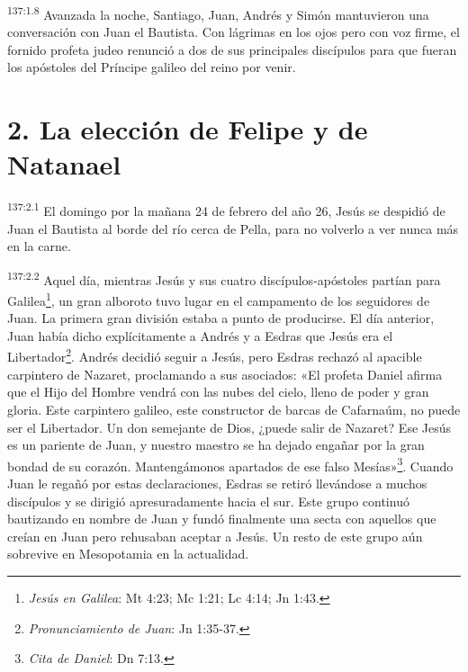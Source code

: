 \par
\textsuperscript{137:1.8} Avanzada la noche, Santiago, Juan, Andrés y Simón mantuvieron una conversación con Juan el Bautista. Con lágrimas en los ojos pero con voz firme, el fornido profeta judeo renunció a dos de sus principales discípulos para que fueran los apóstoles del Príncipe galileo del reino por venir.

\section*{2. La elección de Felipe y de Natanael}
\par
\textsuperscript{137:2.1} El domingo por la mañana 24 de febrero del año 26, Jesús se despidió de Juan el Bautista al borde del río cerca de Pella, para no volverlo a ver nunca más en la carne.

\par
\textsuperscript{137:2.2} Aquel día, mientras Jesús y sus cuatro discípulos-apóstoles partían para Galilea\footnote{\textit{Jesús en Galilea}: Mt 4:23; Mc 1:21; Lc 4:14; Jn 1:43.}, un gran alboroto tuvo lugar en el campamento de los seguidores de Juan. La primera gran división estaba a punto de producirse. El día anterior, Juan había dicho explícitamente a Andrés y a Esdras que Jesús era el Libertador\footnote{\textit{Pronunciamiento de Juan}: Jn 1:35-37.}. Andrés decidió seguir a Jesús, pero Esdras rechazó al apacible carpintero de Nazaret, proclamando a sus asociados: «El profeta Daniel afirma que el Hijo del Hombre vendrá con las nubes del cielo, lleno de poder y gran gloria. Este carpintero galileo, este constructor de barcas de Cafarnaúm, no puede ser el Libertador. Un don semejante de Dios, ¿puede salir de Nazaret? Ese Jesús es un pariente de Juan, y nuestro maestro se ha dejado engañar por la gran bondad de su corazón. Mantengámonos apartados de ese falso Mesías»\footnote{\textit{Cita de Daniel}: Dn 7:13.}. Cuando Juan le regañó por estas declaraciones, Esdras se retiró llevándose a muchos discípulos y se dirigió apresuradamente hacia el sur. Este grupo continuó bautizando en nombre de Juan y fundó finalmente una secta con aquellos que creían en Juan pero rehusaban aceptar a Jesús. Un resto de este grupo aún sobrevive en Mesopotamia en la actualidad.


